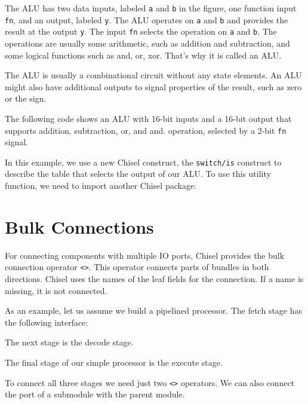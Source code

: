 \documentclass[%
    10pt,
    headinclude, footexclude,
    openright, %
    notitlepage,
    cleardoubleempty,
    headsepline,
    pointlessnumbers,
    bibtotoc, idxtotoc,
    ]{scrbook}
\newcommand{\code}[1]{{\lstinline[basicstyle=\small\ttfamily]{#1}}}
\begin{document}
The ALU has two data inputs, labeled \code{a} and \code{b} in the figure, one function input \code{fn},
and an output, labeled \code{y}. The ALU operates on \code{a} and \code{b} and provides the result
at the output \code{y}. The input \code{fn} selects the operation on \code{a} and \code{b}.
The operations are usually some arithmetic, such as addition and subtraction, and some logical
functions such as and, or, xor. That's why it is called an ALU.

The ALU is usually a combinational circuit without any state elements.
An ALU might also have additional outputs to signal properties
of the result, such as zero or the sign.


The following code shows an ALU with 16-bit inputs and a 16-bit output that supports
addition, subtraction, or, and and.
operation, selected by a 2-bit \code{fn} signal.


\noindent In this example, we use a new Chisel construct, the \code{switch/is} construct to describe
the table that selects the output of our ALU.
To use this utility function, we need to import another Chisel package:


\section{Bulk Connections}


For connecting components with multiple IO ports, Chisel provides the
bulk connection operator \code{<>}. This operator connects parts of bundles
in both directions. Chisel uses the names of the leaf fields for the connection.
If a name is missing, it is not connected.

As an example, let us assume we build a pipelined processor. The fetch
stage has the following interface:

\noindent The next stage is the decode stage.

\noindent The final stage of our simple processor is the execute stage.

To connect all three stages we need just two \code{<>} operators.
We can also connect the port of a submodule with the parent module.
\end{document}
